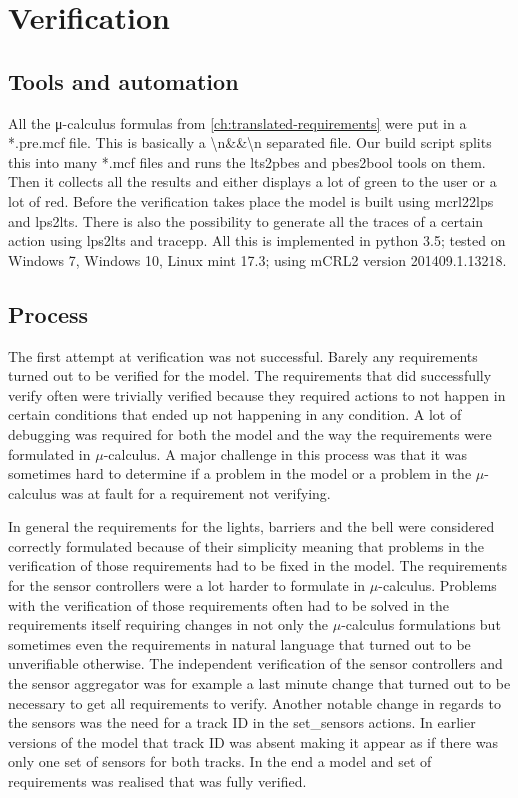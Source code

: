 \documentclass[final]{report}
\begin{document}
\chapter{Verification}
\label{ch:verification}
\section{Tools and automation}
All the μ-calculus formulas from \cref{ch:translated-requirements} were put in a *.pre.mcf file.
This is basically a \textbackslash n\&\&\textbackslash n separated file.
Our build script splits this into many *.mcf files and runs the lts2pbes and pbes2bool tools on them.
Then it collects all the results and either displays a lot of green to the user or a lot of red.
Before the verification takes place the model is built using mcrl22lps and lps2lts.
There is also the possibility to generate all the traces of a certain action using lps2lts and tracepp.
All this is implemented in python 3.5; tested on Windows 7, Windows 10, Linux mint 17.3; using mCRL2 version 201409.1.13218.

\section{Process}
The first attempt at verification was not successful. Barely any requirements turned out to be verified for the model. The requirements that did successfully verify often were trivially verified because they required actions to not happen in certain conditions that ended up not happening in any condition. A lot of debugging was required for both the model and the way the requirements were formulated in $\mu$-calculus. A major challenge in this process was that it was sometimes hard to determine if a problem in the model or a problem in the $\mu$-calculus was at fault for a requirement not verifying.

In general the requirements for the lights, barriers and the bell were considered correctly formulated because of their simplicity meaning that problems in the verification of those requirements had to be fixed in the model. The requirements for the sensor controllers were a lot harder to formulate in $\mu$-calculus. Problems with the verification of those requirements often had to be solved in the requirements itself requiring changes in not only the $\mu$-calculus formulations but sometimes even the requirements in natural language that turned out to be unverifiable otherwise. The independent verification of the sensor controllers and the sensor aggregator was for example a last minute change that turned out to be necessary to get all requirements to verify. Another notable change in regards to the sensors was the need for a track ID in the set\_sensors actions. In earlier versions of the model that track ID was absent making it appear as if there was only one set of sensors for both tracks. In the end a model and set of requirements was realised that was fully verified.
\end{document}
